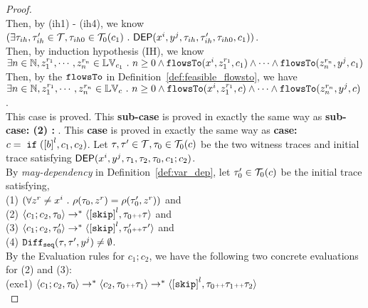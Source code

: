 \begin{proof}
\\
Then, by (ih1) - (ih4), we know\\
 $(\exists \mathtt{\tau}_{ih}, \mathtt{\tau}_{ih}' \in \mathcal{T}, 
\mathtt{\tau}_{ih0} \in \mathcal{T}_0(c_1) ~.~   \mathsf{DEP}(x^i, y^j, \mathtt{\tau}_{ih}, \mathtt{\tau}_{ih}', \mathtt{\tau}_{ih0}, {c_1}) )$.
\\
Then, by induction hypothesis (IH), we know 
\\
$\exists n \in \mathbb{N}, z_1^{r_1}, \cdots, z_n^{r_n} \in \mathbb{LV}_{{c_1}} ~.~   n \geq 0 \land
\mathtt{flowsTo}(x^i,  z_1^{r_1}, c_1) 
\land \cdots \land \mathtt{flowsTo}(z_n^{r_n}, y^j, c_1)$
\\
Then, by the $\mathtt{flowsTo}$ in Definition~\ref{def:feasible_flowsto}, we have 
\\
$\exists n \in \mathbb{N}, z_1^{r_1}, \cdots, z_n^{r_n} \in \mathbb{LV}_{{c}} ~.~   n \geq 0 \land
\mathtt{flowsTo}(x^i,  z_1^{r_1}, c) 
\land \cdots \land \mathtt{flowsTo}(z_n^{r_n}, y^j, c)$.
\\
This case is proved.
This \textbf{sub-case} is proved in exactly the same way as \textbf{sub-case: (2) : }.
  This \textbf{case} is proved in exactly the same way as \textbf{case: $c = \eif(\clabel{\bexpr}^{l} , {c_1}, {c_2})$}.
  Let $\mathtt{\tau}, \mathtt{\tau}' \in \mathcal{T}, \mathtt{\tau}_0 \in \mathcal{T}_0(c)$ be the two witness traces and initial trace satisfying 
  $\mathsf{DEP}(x^i, y^j, \mathtt{\tau}_1, \mathtt{\tau}_2, \mathtt{\tau}_0, c_1; c_2)$.
  \\
  By \emph{may-dependency} in Definition~\ref{def:var_dep}, let $\mathtt{\tau}_0' \in \mathcal{T}_0(c)$ be the initial trace satisfying,
  \\
  (1) $ (\forall z^r \neq x^i ~.~     \rho(\mathtt{\tau}_0, z^r ) =   \rho(\mathtt{\tau}_0',z^r) )$
  and \\
  (2) $\config{c_1;c_2 , \trace_0} 
  \rightarrow^{*} \config{\clabel{\eskip}^l, \trace_0  \tracecat \trace } $ 
    and \\
  (3) $\config{c_1;c_2, \trace_0'} \rightarrow^{*} \config{\clabel{\eskip}^l, \trace_0'  \tracecat \trace'}$ 
    and \\
    (4) $\mathtt{Diff}_{\mathtt{seq}}(\mathtt{\tau}, \mathtt{\tau}', y^j ) \neq \emptyset$.
    \\
  By the Evaluation rules for $c_1;c_2$, we have the following two concrete evaluations for (2) and (3):
  \\
  (exe1) $\config{c_1;c_2 , \trace_0} 
  \rightarrow^{*} \config{c_2, \trace_0  \tracecat \trace_1}
  \rightarrow^{*} \config{\clabel{\eskip}^l, \trace_0  \tracecat \trace_1 \tracecat \trace_2 } $ \\

\end{proof}
